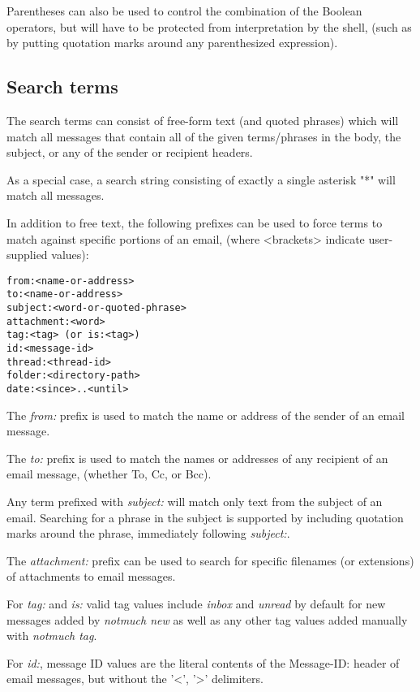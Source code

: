 \documentclass[a4,onecolumn,portrait]{article}
\begin{document}
Parentheses can also be used to control the combination of the Boolean operators, but will have to be protected from interpretation by the shell, (such as by putting quotation marks around any parenthesized expression).
\subsection{Search terms}
\label{sec-8-2}

The search terms can consist of free-form text (and quoted phrases) which will match all messages that contain all of the given terms/phrases in the body, the subject, or any of the sender or recipient headers.

As a special case, a search string consisting of exactly a single asterisk "*" will match all messages.

In addition to free text, the following prefixes can be used to force terms to match against specific portions of an email, (where <brackets> indicate user-supplied values):

\begin{verbatim}
from:<name-or-address>
to:<name-or-address>
subject:<word-or-quoted-phrase>
attachment:<word>
tag:<tag> (or is:<tag>)
id:<message-id>
thread:<thread-id>
folder:<directory-path>
date:<since>..<until>
\end{verbatim}

The \emph{from:} prefix is used to match the name or address of the sender of an email message.

The \emph{to:} prefix is used to match the names or addresses of any recipient of an email message, (whether To, Cc, or Bcc).

Any term prefixed with \emph{subject:} will match only text from the subject of an email. Searching for a phrase in the subject is supported by including quotation marks around the phrase, immediately following \emph{subject:}.

The \emph{attachment:} prefix can be used to search for specific filenames (or extensions) of attachments to email messages.

For \emph{tag:} and \emph{is:} valid tag values include \emph{inbox} and \emph{unread} by default for new messages added by \emph{notmuch new} as well as any other tag values added manually with \emph{notmuch tag}.

For \emph{id:}, message ID values are the literal contents of the Message-ID: header of email messages, but without the '<', '>' delimiters.
\end{document}

